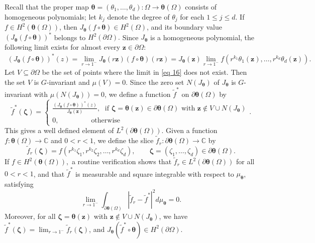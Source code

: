 \documentclass[12pt,reqno]{amsart}
\theoremstyle{remark}
\theoremstyle{definition}
\newcommand{\beq}{\begin{eqnarray}}
\newcommand{\eeq}{\end{eqnarray}}
\def \z{\boldsymbol{z}}
\def \\theta{\boldsymbol{\theta}}
\def \\xi{\boldsymbol{\xi}}
\begin{document}
Recall that the proper map $\boldsymbol \theta=(\theta_1,\ldots, \theta_d) :\Omega \to \boldsymbol \theta(\Omega)$ consists of homogeneous polynomials; let $k_j$ denote the degree of $\theta_j$ for each $1\leq j\leq d.$  
If $f\in H^2(\boldsymbol \theta(\Omega))$, then $J_{\boldsymbol \theta}(f \circ \boldsymbol \theta) \in H^2(\Omega)$, and its boundary value $(J_{\boldsymbol \theta}(f \circ \boldsymbol \theta) )^*$ belongs to $ H^2(\partial\Omega).$ Since $J_{\boldsymbol \theta}$ is a homogeneous polynomial, the following limit exists for almost every $\z\in \partial\Omega$: \beq \label{eq 16}(J_{\boldsymbol \theta}(f \circ \boldsymbol \theta) )^*(z)=\lim_{r \to 1^-} J_{\boldsymbol \theta}(r\z)(f \circ \boldsymbol \theta)(r\z)=J_{\boldsymbol \theta}(\z) \lim_{r \to 1^-}f(r^{k_1} \theta_1(\z), \ldots, r^{k_d}\theta_d(\z)).\eeq
Let $V\subseteq \partial\Omega$ be the set of points where the limit in \eqref{eq 16} does not exist. Then the set $V$ is $G$-invariant and $\mu(V)=0$. Since the zero set $N(J_{\boldsymbol \theta})$ of $J_{\boldsymbol \theta}$ is $G$-invariant with $\mu(N(J_{\boldsymbol \theta}))=0$, we define a function $\tilde{f}^*$ on $\partial\boldsymbol \theta(\Omega)$ by
$$\tilde{f}^* (\boldsymbol \zeta)=\begin{cases}
    \frac{(J_{\boldsymbol \theta}(f \circ \boldsymbol \theta) )^*(z)}{J_{\boldsymbol \theta}(\z)}, \; \text{ if } \boldsymbol \zeta=\boldsymbol \theta(\z)\in \partial\boldsymbol \theta(\Omega) \text{ with } \z \notin V\cup N(J_{\boldsymbol \theta})\\
    0, \qquad\qquad\;\; \text{otherwise}
\end{cases}.$$
This gives a well defined element of $L^2(\partial\boldsymbol \theta(\Omega)).$ 
Given a function $f:\boldsymbol \theta(\Omega) \to \mathbb C$ and $0<r<1$, we define the slice $\tilde{f}_r:\partial\boldsymbol \theta(\Omega)\to \mathbb C$ by $$\tilde{f}_r(\boldsymbol \zeta)=f(r^{k_1}\zeta_1, r^{k_2} \zeta_2,\ldots, r^{k_d} \zeta_d),\qquad \boldsymbol \zeta=(\zeta_1,\ldots,\zeta_d)\in \partial\boldsymbol \theta(\Omega).$$ 
If $f\in H^2(\boldsymbol \theta(\Omega)),$ a routine verification shows that  $\tilde{f}_r \in L^2(\partial\boldsymbol \theta(\Omega))$ for all $0<r<1$, and that $\tilde{f}^*$ is measurable and square integrable with respect to $\mu_{\boldsymbol \theta}$, satisfying $$\lim_{r \to 1^-} \int_{\partial\boldsymbol \theta(\Omega)} |\tilde{f}_r-\tilde{f}^*|^2d\mu_{\boldsymbol \theta}=0.$$ Moreover, for all $\boldsymbol \zeta=\boldsymbol\theta(\z)$ with $\z\notin V\cup N(J_{\boldsymbol \theta})$, we have  $\tilde{ f}^*(\boldsymbol \zeta)=\lim_{r\to 1^-} \tilde{f}_r(\boldsymbol \zeta)$, and $J_{\boldsymbol \theta} (\tilde{f}^* \circ \boldsymbol \theta) \in H^2(\partial\Omega).$
\end{document}

